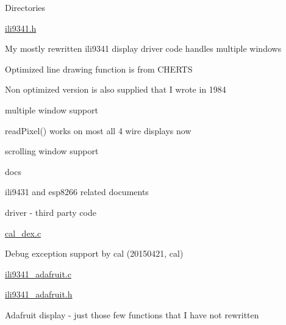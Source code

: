 \begin{DoxyParagraph}{Directories}
\begin{DoxyItemize}
\begin{DoxyItemize}
\item \hyperlink{ili9341_8h}{ili9341.\-h}
\begin{DoxyItemize}
\item My mostly rewritten ili9341 display driver code handles multiple windows
\begin{DoxyItemize}
\item Optimized line drawing function is from C\-H\-E\-R\-T\-S
\item Non optimized version is also supplied that I wrote in 1984
\item multiple window support
\item read\-Pixel() works on most all 4 wire displays now
\item scrolling window support
\end{DoxyItemize}
\end{DoxyItemize}
\end{DoxyItemize}
\item docs
\begin{DoxyItemize}
\item ili9431 and esp8266 related documents
\end{DoxyItemize}
\item driver -\/ third party code
\begin{DoxyItemize}
\item \hyperlink{cal__dex_8c}{cal\-\_\-dex.\-c}
\begin{DoxyItemize}
\item Debug exception support by cal (20150421, cal)
\end{DoxyItemize}
\item \hyperlink{ili9341__adafruit_8c}{ili9341\-\_\-adafruit.\-c}
\item \hyperlink{ili9341__adafruit_8h}{ili9341\-\_\-adafruit.\-h}
\begin{DoxyItemize}
\item Adafruit display -\/ just those few functions that I have not rewritten
\end{DoxyItemize}
\end{DoxyItemize}
\end{DoxyItemize}
\end{DoxyParagraph}

